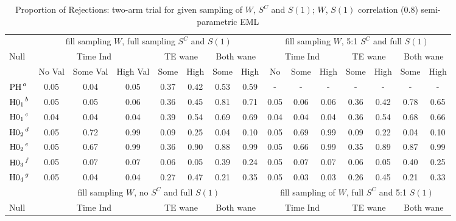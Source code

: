 \documentclass[times, 11pt]{article}
\begin{document}
\begin{table} [H]
\caption{Proportion of Rejections: two-arm trial for given sampling of $W$, $S^{C}$ and $S(1)$; $W$, $S(1)$ correlation (0.8) semi-parametric EML}
\begin{tabular}{l|ccc|cc|cc|ccc|cc|cc}
\hline
&\multicolumn{7}{c}{fill sampling $W$, full sampling $S^{C}$ and $S(1)$} &\multicolumn{7}{c}{fill sampling $W$, 5:1 $S^{C}$ and full $S(1)$}\\
Null&\multicolumn{3}{c}{Time Ind}&\multicolumn{2}{c}{TE wane}&\multicolumn{2}{c}{Both wane}&\multicolumn{3}{c}{Time Ind}&\multicolumn{2}{c}{TE wane}&\multicolumn{2}{c}{Both wane}\\
&No Val&Some Val&High Val&Some&High&Some&High&No&Some&High&Some&High&Some&High\\
\hline
$\mbox{PH}^{\hspace{0.5mm}a}$&0.05&0.04&0.05&0.37&0.42&0.53&0.59&-&-&-&-&-&-&-\\
${\mbox{H0}_1}^{\hspace{0.5mm}b}$&0.05 & 0.05 & 0.06 & 0.36 & 0.45 & 0.81 & 0.71 &0.05 & 0.06 & 0.06 & 0.36 & 0.42 & 0.78 & 0.65\\
${\mbox{H0}_1}^{\hspace{0.5mm}c}$& 0.04 & 0.04 & 0.04 & 0.39 & 0.54 & 0.69 & 0.69 & 0.04 & 0.04 & 0.04 & 0.36 & 0.54 & 0.68 & 0.66\\
${\mbox{H0}_2}^{\hspace{0.5mm}d}$&0.05 & 0.72 & 0.99 & 0.09 & 0.25 & 0.04 & 0.10 &0.05 & 0.69 & 0.99 & 0.09 & 0.22 & 0.04 & 0.10\\
${\mbox{H0}_2}^{\hspace{0.5mm}e}$& 0.05 & 0.67 & 0.99 & 0.36 & 0.90 & 0.88 & 0.99& 0.05 & 0.66 & 0.99 & 0.35 & 0.89 & 0.87 & 0.99\\
${\mbox{H0}_3}^{\hspace{0.5mm}f}$&0.05 & 0.07 & 0.07 & 0.06 & 0.05 & 0.39 & 0.24 & 0.05 & 0.07 & 0.07 & 0.06 & 0.05 & 0.40 & 0.25 \\ 
${\mbox{H0}_4}^{\hspace{0.5mm}g}$&0.05 & 0.04 & 0.04 & 0.27 & 0.47 & 0.21 & 0.35 & 0.05 & 0.03 & 0.03 & 0.26 & 0.45 & 0.21 & 0.33 \\ 
\hline
&\multicolumn{7}{c}{fill sampling $W$, no $S^{C}$ and full $S(1)$} &\multicolumn{7}{c}{fill sampling of $W$,  full $S^{C}$ and 5:1 $S(1)$}\\
Null&\multicolumn{3}{c}{Time Ind}&\multicolumn{2}{c}{TE wane}&\multicolumn{2}{c}{Both wane}&\multicolumn{3}{c}{Time Ind}&\multicolumn{2}{c}{TE wane}&\multicolumn{2}{c}{Both wane}\\

\end{tabular}
\end{table}
\end{document}

